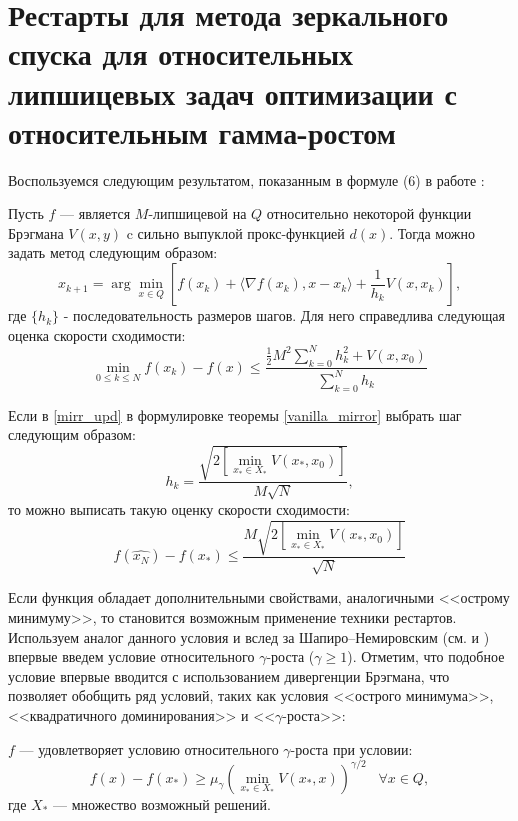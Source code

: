 \section{Рестарты для метода зеркального спуска для относительных липшицевых задач оптимизации с относительным гамма-ростом}\label{sec:ch3/sect3}
    Воспользуемся следующим результатом, показанным в формуле (6) в работе \cite{Lu_2018}:
    \begin{theorem} \label{vanilla_mirror}
        Пусть $f$ --- является $M$-липшицевой на $Q$ относительно некоторой функции Брэгмана $V(x, y)$ c сильно выпуклой прокс-функцией $d(x)$. Тогда можно задать метод следующим образом:
        \begin{equation} \label{mirr_upd}
            x_{k+1} = \arg \min_{x \in Q} {\left[ f(x_k) + \langle \nabla f(x_k), x - x_k \rangle + \frac{1}{h_k} V(x, x_k)\right]},
        \end{equation}
        где $\{ h_k \}$ - последовательность размеров шагов.
        Для него справедлива следующая оценка скорости сходимости:
        \begin{equation} \label{general_est}
            \min_{0\leq k \leq N} f(x_k) - f(x) \leq \frac{\frac{1}{2} M^2 \sum_{k=0}^N h_k^2 + V(x, x_0)}{\sum_{k=0}^N h_k}
        \end{equation}
    \end{theorem}

    \begin{remark}
        Если в \eqref{mirr_upd} в формулировке теоремы \ref{vanilla_mirror} выбрать шаг следующим образом:
        \begin{equation} \label{mirr_step}
            h_{k} = \frac{\sqrt{2 \left[\min\limits_{x_* \in X_*}{V(x_*, x_0)}\right] }}{M\sqrt{N}},
        \end{equation}
        то можно выписать такую оценку скорости сходимости:
        \begin{equation} \label{mirr_est}
            f(\widehat{x_N}) - f(x_*) \leq \frac{M\sqrt{2 \left[\min\limits_{x_* \in X_*}{V(x_*, x_0)}\right]}}{\sqrt{N}}
        \end{equation}
    \end{remark}
    Если функция обладает дополнительными свойствами, аналогичными <<острому минимуму>>,  то становится возможным применение техники рестартов. Используем аналог данного условия и вслед за Шапиро–Немировским (см. \cite{shapiro_2005} и \cite{shapiro_2021} ) впервые введем условие относительного $\gamma$-роста ($\gamma \geq 1$). Отметим, что подобное условие впервые вводится с использованием дивергенции Брэгмана, что позволяет обобщить ряд условий, таких как условия <<острого минимума>>, <<квадратичного доминирования>> и <<$\gamma$-роста>>:
    \begin{definition}
       $f$ --- удовлетворяет условию относительного $\gamma$-роста при условии:
       \begin{equation} \label{gamma-growth}
           f(x) - f(x_*) \geq \mu_{\gamma}\left(\min_{x_* \in X_*}{V(x_*,x)}\right)^{\gamma/2} \;\;\; \forall x \in Q,
       \end{equation}
       где $X_*$ --- множество возможный решений.  
    \end{definition}
    

